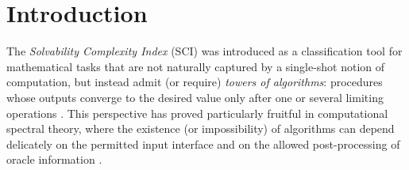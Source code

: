 \documentclass{lmcs} %
\theoremstyle{plain}
\theoremstyle{plain}
\theoremstyle{definition}
\theoremstyle{remark}
\theoremstyle{definition}
\theoremstyle{remark}
\numberwithin{equation}{section}
\begin{document}
\begin{abstract}
Finally, we give self-contained canonical source problems over Cantor-matrix inputs which realize arbitrary finite standard raw type-G SCI heights. These examples are
not presented as computability models by themselves; rather, they are calibration objects for the extensional SCI and for the interaction between finite-query information, Borel hierarchy level, restricted SCI towers, and Weihrauch-style uniform iterated-limit complexity.
\end{abstract}

\maketitle

\section{Introduction}

The \textit{Solvability Complexity Index} (SCI) was introduced as a classification tool for
mathematical tasks that are not naturally captured by a single-shot notion of computation,
but instead admit (or require) \textit{towers of algorithms}: procedures whose outputs converge
to the desired value only after one or several limiting operations \cite{hansen2011solvability,ben2015computing,ColbrookHansen22}.
This perspective has proved particularly fruitful in computational spectral theory, where
the existence (or impossibility) of algorithms can depend delicately on the permitted input
interface and on the allowed post-processing of oracle information \cite{hansen2011solvability,ColbrookHansen22}.
\end{document}
